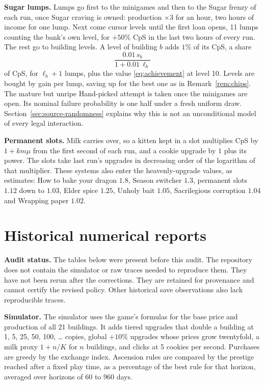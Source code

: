 \documentclass[11pt,a4paper]{article}
\numberwithin{equation}{section}
\theoremstyle{definition}
\theoremstyle{remark}
\newcommand{\proofstep}[1]{\par\addvspace{\medskipamount}\noindent\textbf{#1}\enspace\ignorespaces}
\begin{document}
\proofstep{Sugar lumps.} Lumps go first to the minigames and then to the Sugar frenzy of each run, once Sugar craving is owned: production $\times3$ for an hour, two hours of income for one lump. Next come cursor levels until the first loan opens, 11 lumps counting the bank's own level, for $+50\%$ CpS in the last two hours of every run. The rest go to building levels. A level of building $b$ adds $1\%$ of its CpS, a share
\begin{equation}\label{eq:level}
 \frac{0.01\,s_b}{1+0.01\,\ell_b}
\end{equation}
of CpS, for $\ell_b+1$ lumps, plus the value \eqref{eq:achievement} at level 10. Levels are bought by gain per lump, saving up for the best one as in Remark~\ref{rem:chips}. The mature but unripe Hand-picked attempt is taken once the minigames are open. Its nominal failure probability is one half under a fresh uniform draw. Section~\ref{sec:source-randomness} explains why this is not an unconditional model of every legal interaction.

\proofstep{Permanent slots.} Milk carries over, so a kitten kept in a slot multiplies CpS by $1+km\mu$ from the first second of each run, and a cookie upgrade by $1$ plus its power. The slots take last run's upgrades in decreasing order of the logarithm of that multiplier. These systems also enter the heavenly-upgrade values, as estimates: How to bake your dragon $1.8$, Season switcher $1.3$, permanent slots $1.12$ down to $1.03$, Elder spice $1.25$, Unholy bait $1.05$, Sacrilegious corruption $1.04$ and Wrapping paper $1.02$.

\section{Historical numerical reports}\label{sec:numerics}
\textbf{Audit status.} The tables below were present before this audit. The repository does not contain the simulator or raw traces needed to reproduce them. They have not been rerun after the corrections. They are retained for provenance and cannot certify the revised policy. Other historical save observations also lack reproducible traces.

\proofstep{Simulator.} The simulator uses the game's formulas for the base price and production of all 21 buildings. It adds tiered upgrades that double a building at 1, 5, 25, 50, 100, \ldots{} copies, global $+10\%$ upgrades whose prices grow twentyfold, a milk proxy $1+n/K$ for $n$ buildings, and clicks at 5 cookies per second. Purchases are greedy by the exchange index. Ascension rules are compared by the prestige reached after a fixed play time, as a percentage of the best rule for that horizon, averaged over horizons of 60 to 960 days.
\end{document}
